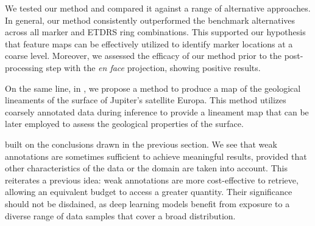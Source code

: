 We tested our method and compared it against a range of alternative approaches. In general, our method consistently outperformed the benchmark alternatives across all marker and ETDRS ring combinations. This supported our hypothesis that feature maps can be effectively utilized to identify marker locations at a coarse level. Moreover, we assessed the efficacy of our method prior to the post-processing step with the \textit{en face} projection, showing positive results.

On the same line, in , we propose a method to produce a map of the geological lineaments of the surface of Jupiter's satellite Europa. This method utilizes coarsely annotated data during inference to provide a lineament map that can be later employed to assess the geological properties of the surface. 

 built on the conclusions drawn in the previous section. We see that weak annotations are sometimes sufficient to achieve meaningful results, provided that other characteristics of the data or the domain are taken into account. This reiterates a previous idea: weak annotations are more cost-effective to retrieve, allowing an equivalent budget to access a greater quantity. Their significance should not be disdained, as deep learning models benefit from exposure to a diverse range of data samples that cover a broad distribution.